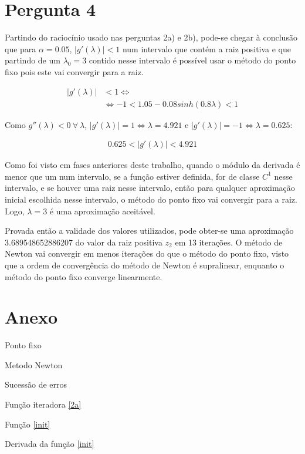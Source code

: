 \documentclass[a4paper, 18pt]{article}
\begin{document}
\section{Pergunta 4}
	\par Partindo do raciocínio usado nas perguntas 2a) e  2b), pode-se chegar à conclusão que para $\alpha = 0.05$, $|g'(\lambda)| < 1$ num intervalo que contém a raiz positiva e que partindo de um $\lambda_0 = 3$ contido nesse intervalo é possível usar o método do ponto fixo pois este vai convergir para a raiz.
	
	\begin{align*}
		|g'(\lambda)| &< 1 \Leftrightarrow \\ &\Leftrightarrow
		-1 < 1.05 - 0.08sinh(0.8\lambda) < 1
	\end{align*}
	
	Como $g''(\lambda) < 0 \> \forall \> \lambda$,  $|g'(\lambda)| = 1 \Leftrightarrow \lambda = 4.921$ e $|g'(\lambda)| = -1 \Leftrightarrow \lambda = 0.625$:
	
	\begin{align*}
		0.625 < |g'(\lambda)| < 4.921
	\end{align*}
	
	\par Como foi visto em fases anteriores deste trabalho, quando o módulo da derivada é menor que um num intervalo, se a função estiver definida, for de classe $C^1$ nesse intervalo, e se houver uma raiz nesse intervalo, então para qualquer aproximação inicial escolhida nesse intervalo, o método do ponto fixo vai convergir para a raiz. Logo, $\lambda = 3$ é uma aproximação aceitável. \\
	
	\par Provada então a validade dos valores utilizados, pode obter-se uma aproximação 3.689548652886207 do valor da raiz positiva $z_2$ em 13 iterações. O método de Newton vai convergir em menos iterações do que o método do ponto fixo, visto que a ordem de convergência do método de Newton é supralinear, enquanto o método do ponto fixo converge linearmente.


\newpage

\section{Anexo}

\par{Ponto fixo}
	

\par{Metodo Newton}
	

\newpage
\par{Sucessão de erros}
	

\par{Função iteradora \eqref{2a}}
	

\par{Função \eqref{init}}
	

\par{Derivada da função \eqref{init}}
	
\end{document}
